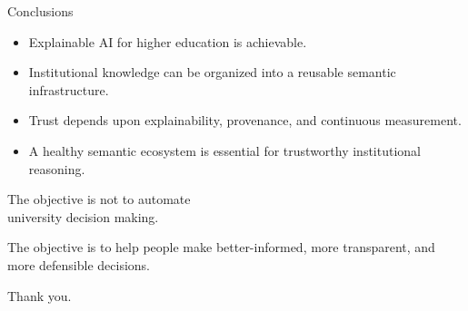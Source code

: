 \documentclass[aspectratio=169]{beamer}
\begin{document}
\begin{frame}{Conclusions}

\begin{itemize}

\item Explainable AI for higher education is achievable.

\bigskip

\item Institutional knowledge can be organized into a reusable
semantic infrastructure.

\bigskip

\item Trust depends upon explainability, provenance,
and continuous measurement.

\bigskip

\item A healthy semantic ecosystem is essential for
trustworthy institutional reasoning.

\end{itemize}

\end{frame}


\begin{frame}

\centering

\vspace{0.8cm}

{\LARGE
The objective is not to automate\\[0.3cm]
university decision making.
}

\vspace{1.2cm}

{\Large
The objective is to help people make
better-informed,
more transparent,
and more defensible decisions.
}

\vfill

{\large
Thank you.
}

\end{frame}

\end{document}

